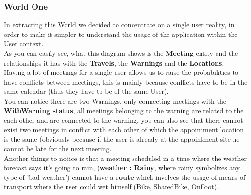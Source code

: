
\subsubsection{World One}

In extracting this World we decided to concentrate on a single user reality, in order to make it simpler to understand the usage of the application within the User context.
\\As you can easily see, what this diagram shows is the \textbf{Meeting} entity and the relationships it has with the \textbf{Travels}, the \textbf{Warnings} and the \textbf{Locations}.
\\Having a lot of meetings for a single user allows us to raise the probabilities to have conflicts between meetings, this is mainly because conflicts have to be in the same calendar (thus they have to be of the same User).
\\You can notice there are two Warnings, only connecting meetings with the \textbf{WithWarning status}, all meetings belonging to the warning are related to the each other and are connected to the warning, you can also see that there cannot exist two meetings in conflict with each other of which the appointment location is the same (obviously because if the user is already at the appointment site he cannot be late for the next meeting.
\\Another things to notice is that a meeting scheduled in a time where the weather forecast says it's going to rain, (\textbf{weather : Rainy}, where rainy symbolizes any type of 'bad weather') cannot have a \textbf{route} which involves the usage of means of transport where the user could wet himself (Bike, SharedBike, OnFoot).

